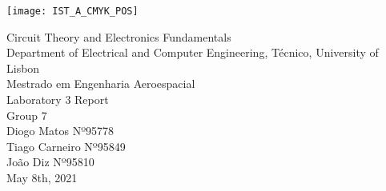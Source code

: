 
\thispagestyle {empty}

\texttt{[image: IST\_A\_CMYK\_POS]}

\begin{center}
%
\vspace{1.0cm}

\vspace{1cm}
{\FontLb Circuit Theory and Electronics Fundamentals} \\ %
\vspace{1cm}
{\FontSn Department of Electrical and Computer Engineering, Técnico, University of Lisbon} \\ %
{\FontSn Mestrado em Engenharia Aeroespacial} \\
\vspace{3cm}
{\FontSn Laboratory 3 Report} \\[1cm]
{\FontSn Group 7} \\[2cm]
{\FontSn Diogo Matos Nº95778} \\
{\FontSn Tiago Carneiro Nº95849} \\
{\FontSn João Diz Nº95810} \\
\vspace{10cm}
{\FontSn May 8th, 2021} \\ %
%
\end{center}


